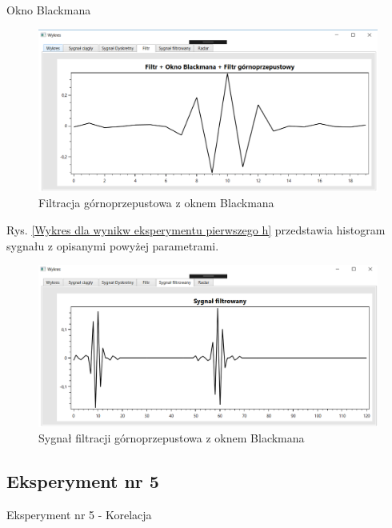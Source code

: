 \documentclass[12pt]{article}
\begin{document}
\newpage
Okno Blackmana
\begin{figure}[h!]
 \centering
 \includegraphics[width=12.3cm]{prostFGOB.PNG}
 \vspace{-0.3cm}
 \caption{Filtracja górnoprzepustowa z oknem Blackmana}
 \label{Wykres dla wyników eksperymentu drugiego}
\end{figure}
\newpage
Rys. \ref{Wykres dla wynikw eksperymentu pierwszego h} przedstawia histogram sygnału z opisanymi powyżej parametrami. 
\begin{figure}[h!]
 \centering
 \includegraphics[width=12.3cm]{prostSFGB.PNG}
 \vspace{-0.3cm}
 \caption{Sygnał filtracji górnoprzepustowa z oknem Blackmana}
 \label{Histogram dla wyników eksperymentu drugiego}
\end{figure}



\subsection{Eksperyment nr 5}

Eksperyment nr 5 - Korelacja\\
\end{document}

